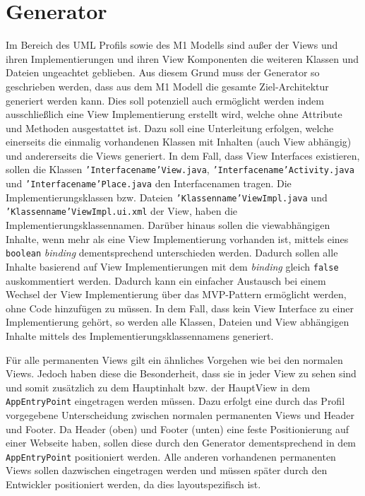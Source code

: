 \section{Generator}\label{AufBGenerator}
Im Bereich des UML Profils sowie des M1 Modells sind außer der Views und ihren
Implementierungen und ihren View Komponenten die weiteren Klassen und Dateien
ungeachtet geblieben. Aus diesem Grund muss der Generator so geschrieben werden,
dass aus dem M1 Modell die gesamte Ziel-Architektur generiert werden kann.
Dies soll potenziell auch ermöglicht werden indem ausschließlich eine View
Implementierung erstellt wird, welche ohne Attribute und Methoden ausgestattet ist. Dazu soll
eine Unterleitung erfolgen, welche einerseits die einmalig vorhandenen Klassen
mit Inhalten (auch View abhängig) und andererseits die Views
generiert. In dem Fall, dass View Interfaces existieren, sollen die Klassen
\texttt{'Interfacename'View.java},
\texttt{'Interfacename'Activity.java} und \texttt{'Interfacename'Place.java} den Interfacenamen tragen. Die
Implementierungsklassen bzw. Dateien \texttt{'Klassenname'ViewImpl.java}
und \texttt{'Klassenname'ViewImpl.ui.xml} der View, haben die
Implementierungsklassennamen. Darüber hinaus sollen die viewabhängigen Inhalte,
wenn mehr als eine View Implementierung vorhanden ist, mittels eines
\texttt{boolean} \textit{binding} dementsprechend unterschieden werden. Dadurch
sollen alle Inhalte basierend auf View Implementierungen mit dem
\textit{binding} gleich \texttt{false} auskommentiert werden.
Dadurch kann ein einfacher Austausch bei einem Wechsel der View Implementierung
über das MVP-Pattern ermöglicht werden, ohne Code hinzufügen zu müssen.
In dem Fall, dass kein View Interface zu einer Implementierung gehört, so werden
alle Klassen, Dateien und View abhängigen Inhalte mittels des
Implementierungsklassennamens generiert.

Für alle permanenten Views gilt ein
ähnliches Vorgehen wie bei den normalen Views. Jedoch haben diese die
Besonderheit, dass sie in jeder View zu sehen sind und somit zusätzlich zu dem
Hauptinhalt bzw. der HauptView in dem \texttt{AppEntryPoint} eingetragen
werden müssen. Dazu erfolgt eine durch das Profil vorgegebene Unterscheidung
zwischen normalen permanenten Views und Header und Footer. Da Header (oben) und Footer
(unten) eine feste Positionierung auf einer Webseite haben, sollen diese durch
den Generator dementsprechend in dem \texttt{AppEntryPoint} positioniert
werden.
Alle anderen vorhandenen permanenten Views sollen dazwischen eingetragen werden
und müssen später durch den Entwickler positioniert werden, da dies
layoutspezifisch ist.

